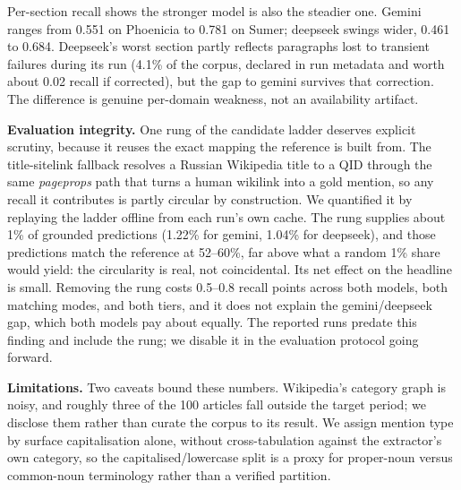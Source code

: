 \documentclass[sigconf,review]{acmart}
\begin{document}
Per-section recall shows the stronger model is also the steadier one. Gemini
ranges from 0.551 on Phoenicia to 0.781 on Sumer; deepseek swings wider, 0.461
to 0.684. Deepseek's worst section partly reflects paragraphs lost to
transient failures during its run (4.1\% of the corpus, declared in run
metadata and worth about 0.02 recall if corrected), but the gap to gemini
survives that correction. The difference is genuine per-domain weakness, not
an availability artifact.

\textbf{Evaluation integrity.} One rung of the candidate ladder deserves
explicit scrutiny, because it reuses the exact mapping the reference is built
from. The title-sitelink fallback resolves a Russian Wikipedia title to a QID
through the same \emph{pageprops} path that turns a human wikilink into a
gold mention, so any recall it contributes is partly circular by
construction. We quantified it by replaying the ladder offline from each
run's own cache. The rung supplies about 1\% of grounded predictions (1.22\%
for gemini, 1.04\% for deepseek), and those predictions match the reference
at 52--60\%, far above what a random 1\% share would yield: the circularity
is real, not coincidental. Its net effect on the headline is small. Removing
the rung costs 0.5--0.8 recall points across both models, both matching
modes, and both tiers, and it does not explain the gemini/deepseek gap, which
both models pay about equally. The reported runs predate this finding and
include the rung; we disable it in the evaluation protocol going forward.

\textbf{Limitations.} Two caveats bound these numbers. Wikipedia's category
graph is noisy, and roughly three of the 100 articles fall outside the target
period; we disclose them rather than curate the corpus to its result. We
assign mention type by surface capitalisation alone, without
cross-tabulation against the extractor's own category, so the
capitalised/lowercase split is a proxy for proper-noun versus common-noun
terminology rather than a verified partition.
\end{document}
